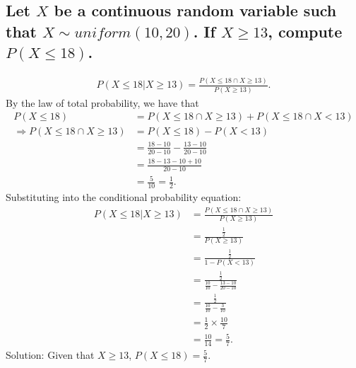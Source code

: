 \documentclass[11pt, letterpaper]{article}
\begin{document}
\subsection*{\normalfont Let $X$ be a continuous random variable such that $X\sim uniform(10,20)$. If 
$X\geq 13$, compute $P(X\leq 18)$.}
\begin{align*}
    P(X\leq 18|X\geq 13)=\frac{P(X\leq 18\cap X\geq 13)}{P(X\geq 13)}.
\end{align*}
By the law of total probability, we have that
\begin{align*}
    P(X\leq 18)&=P(X\leq 18 \cap X\geq 13) + P(X\leq 18 \cap X<13)\\
    \Rightarrow P(X\leq 18 \cap X\geq 13)&=P(X\leq 18)-P(X<13)\\
    &=\frac{18 - 10}{20 - 10} - \frac{13 - 10}{20 - 10}\\
    &=\frac{18 - 13 - 10 + 10}{20 - 10}\\
    &=\frac{5}{10}=\frac{1}{2}.
\end{align*}
Substituting into the conditional probability equation:
\begin{align*}
    P(X\leq 18|X\geq 13)&=\frac{P(X\leq 18\cap X\geq 13)}{P(X\geq 13)}\\
    &=\frac{\frac{1}{2}}{P(X\geq 13)}\\
    &=\frac{\frac{1}{2}}{1 - P(X<13)}\\
    &=\frac{\frac{1}{2}}{\frac{10}{10} - \frac{13 - 10}{20 - 10}}\\
    &=\frac{\frac{1}{2}}{\frac{10}{10} - \frac{3}{10}}\\
    &=\frac{1}{2}\times\frac{10}{7}\\
    &=\frac{10}{14}=\frac{5}{7}.
\end{align*}
Solution: Given that $X\geq 13$, $P(X\leq 18)=\frac{5}{7}$.
\end{document}

